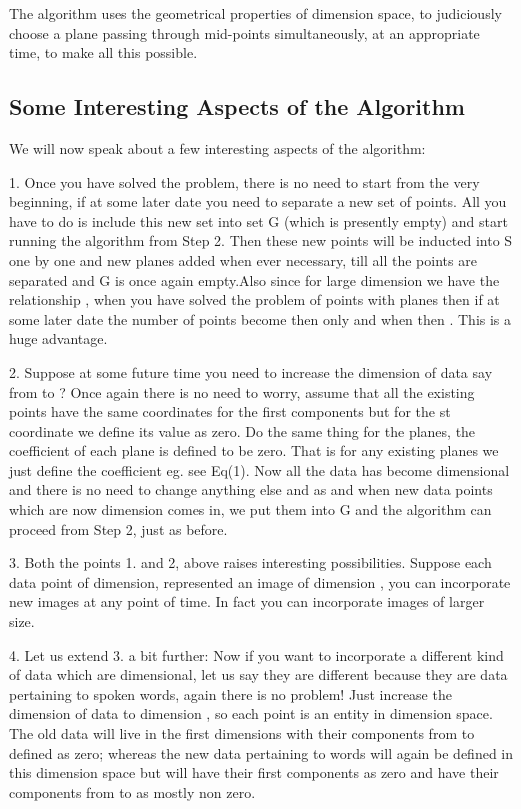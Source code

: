 \documentclass[english]{article}
\begin{document}
The algorithm uses the geometrical properties of dimension space,
to judiciously choose a plane passing through  mid-points simultaneously,
at an appropriate time, to make all this possible.


\subsection{Some Interesting Aspects of the Algorithm}

We will now speak about a few interesting aspects of the algorithm:

1. Once you have solved the problem, there is no need to start from
the very beginning, if at some later date you need to separate a new
set of  points. All you have to do is include this new set
into set G (which is presently empty) and start running the algorithm
from Step 2. Then these new points will be inducted into S one by
one and new planes added when ever necessary, till all the points
are separated and G is once again empty.Also since for large dimension
 we have the relationship , when you have solved
the problem of  points with  planes then if at some later
date the number of points become  then  only
and when  then . This is a
huge advantage.

2. Suppose at some future time you need to increase the dimension
of data say from  to  ? Once again there is no need to worry,
assume that all the existing points have the same coordinates for
the first  components but for the  st coordinate we define
its value as zero. Do the same thing for the planes, the 
coefficient of each plane is defined to be zero. That is for any existing
planes we just define the coefficient  eg. see Eq(1).
Now all the data has become  dimensional and there is no need
to change anything else and as and when new data points which are
now dimension  comes in, we put them into G and the algorithm
can proceed from Step 2, just as before.

3. Both the points 1. and 2, above raises interesting possibilities.
Suppose each data point of  dimension, represented an image of
dimension , you can incorporate new images at any point of time.
In fact you can incorporate images of larger size.

4. Let us extend 3. a bit further: Now if you want to incorporate
a different kind of data which are  dimensional, let us say they
are different because they are data pertaining to spoken words, again
there is no problem! Just increase the dimension of data to dimension
, so each point is an entity in  dimension space. The
old data will live in the first  dimensions with their components
from  to  defined as zero; whereas the new data pertaining
to words will again be defined in this  dimension space but
will have their first  components as zero and have their components
from  to  as mostly non zero.
\end{document}
